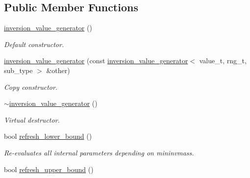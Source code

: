\subsection*{Public Member Functions}
\begin{DoxyCompactItemize}
\item 
\hypertarget{a00321_a14c6174cc3c17ffdf2fcd040cb904c5a}{}\hyperlink{a00321_a14c6174cc3c17ffdf2fcd040cb904c5a}{inversion\+\_\+value\+\_\+generator} ()\label{a00321_a14c6174cc3c17ffdf2fcd040cb904c5a}

\begin{DoxyCompactList}\small\item\em Default constructor. \end{DoxyCompactList}\item 
\hypertarget{a00321_a8bed6b4f358d080c4fd6f15e50fc6ac8}{}\hyperlink{a00321_a8bed6b4f358d080c4fd6f15e50fc6ac8}{inversion\+\_\+value\+\_\+generator} (const \hyperlink{a00321}{inversion\+\_\+value\+\_\+generator}$<$ value\+\_\+t, rng\+\_\+t, sub\+\_\+type $>$ \&other)\label{a00321_a8bed6b4f358d080c4fd6f15e50fc6ac8}

\begin{DoxyCompactList}\small\item\em Copy constructor. \end{DoxyCompactList}\item 
\hypertarget{a00321_a0a325a814ce44e943a8b5932ec6a80ad}{}\hyperlink{a00321_a0a325a814ce44e943a8b5932ec6a80ad}{$\sim$inversion\+\_\+value\+\_\+generator} ()\label{a00321_a0a325a814ce44e943a8b5932ec6a80ad}

\begin{DoxyCompactList}\small\item\em Virtual destructor. \end{DoxyCompactList}\item 
\hypertarget{a00321_a02da89e6bcf998ef31f0724210d58a21}{}bool \hyperlink{a00321_a02da89e6bcf998ef31f0724210d58a21}{refresh\+\_\+lower\+\_\+bound} ()\label{a00321_a02da89e6bcf998ef31f0724210d58a21}

\begin{DoxyCompactList}\small\item\em Re-\/evaluates all internal parameters depending on mininvmass. \end{DoxyCompactList}\item 
\hypertarget{a00321_a0cc4677ad141c3103dd459e587cf0770}{}bool \hyperlink{a00321_a0cc4677ad141c3103dd459e587cf0770}{refresh\+\_\+upper\+\_\+bound} ()\label{a00321_a0cc4677ad141c3103dd459e587cf0770}


\end{DoxyCompactItemize}
